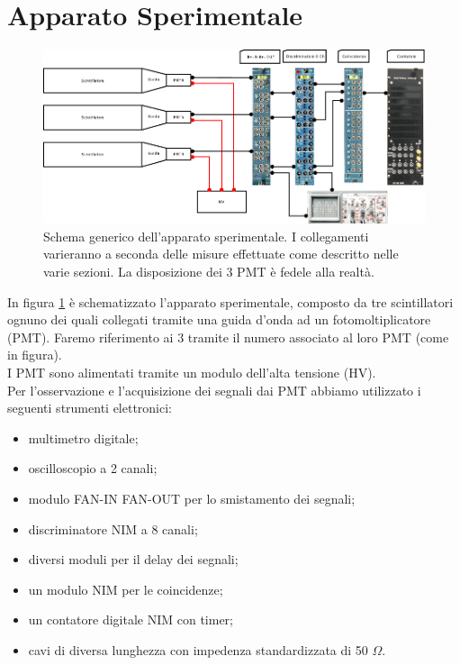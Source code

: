 \documentclass[a4paper,10pt]{article}
\begin{document}
\section{Apparato Sperimentale}
\begin{figure}
\centering
\includegraphics[width=\textwidth]{fig/apparato_sperimentale}
\caption{Schema generico dell'apparato sperimentale. I collegamenti varieranno a seconda delle misure effettuate come descritto nelle varie sezioni. La disposizione dei 3 PMT è fedele alla realtà. }
\label{fig:apparato}
\end{figure}

In figura \ref{fig:apparato} è schematizzato l'apparato sperimentale, composto da tre scintillatori ognuno dei quali collegati tramite una guida d'onda ad un fotomoltiplicatore (PMT). Faremo riferimento ai 3 tramite il numero associato al loro PMT (come in figura).
\\I PMT sono alimentati tramite un modulo dell'alta tensione (HV). 
\\Per l'osservazione e l'acquisizione dei segnali dai PMT abbiamo utilizzato i seguenti strumenti elettronici:
\begin{itemize}
\item multimetro digitale;
\item oscilloscopio a 2 canali;
\item modulo FAN-IN FAN-OUT per lo smistamento dei segnali;
\item discriminatore NIM a 8 canali;
\item diversi moduli per il delay dei segnali;
\item un modulo NIM per le coincidenze;
\item un contatore digitale NIM con timer;
\item cavi di diversa lunghezza con impedenza standardizzata di 50 $\Omega$.
\end{itemize}


\label{sec:apparato} 
\end{document}
